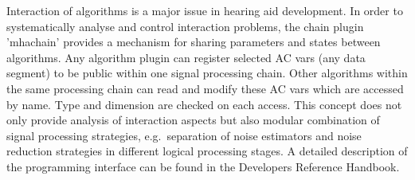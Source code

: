 Interaction of algorithms is a major issue in hearing aid
development. In order to systematically analyse and control
interaction problems, the \mha{} chain plugin 'mhachain' provides 
a mechanism for sharing parameters and states between algorithms. 
Any algorithm plugin can register selected AC vars (any data segment) to be public
within one signal processing chain. Other algorithms within the same 
processing chain can read and modify these AC vars which are accessed by name. Type and dimension are checked on each access. 
This concept does not only provide analysis of interaction aspects 
but also modular combination of signal processing strategies, 
e.g.\ separation of noise estimators and noise reduction strategies 
in different logical processing stages. A detailed description of 
the programming interface can be found in the Developers Reference Handbook.


